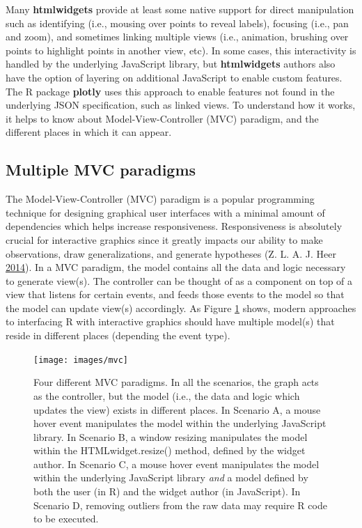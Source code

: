 \documentclass[12pt,]{isuthesis}
\begin{document}
Many \textbf{htmlwidgets} provide at least some native support for
direct manipulation such as identifying (i.e., mousing over points to
reveal labels), focusing (i.e., pan and zoom), and sometimes linking
multiple views (i.e., animation, brushing over points to highlight
points in another view, etc). In some cases, this interactivity is
handled by the underlying JavaScript library, but \textbf{htmlwidgets}
authors also have the option of layering on additional JavaScript to
enable custom features. The R package \textbf{plotly} uses this approach
to enable features not found in the underlying JSON specification, such
as linked views. To understand how it works, it helps to know about
Model-View-Controller (MVC) paradigm, and the different places in which
it can appear.

\subsection{Multiple MVC paradigms}\label{multiple-mvc-paradigms}

The Model-View-Controller (MVC) paradigm is a popular programming
technique for designing graphical user interfaces with a minimal amount
of dependencies which helps increase responsiveness. Responsiveness is
absolutely crucial for interactive graphics since it greatly impacts our
ability to make observations, draw generalizations, and generate
hypotheses (Z. L. A. J. Heer
\protect\hyperlink{ref-2014-latency}{2014}). In a MVC paradigm, the
model contains all the data and logic necessary to generate view(s). The
controller can be thought of as a component on top of a view that
listens for certain events, and feeds those events to the model so that
the model can update view(s) accordingly. As Figure \ref{fig:mvc} shows,
modern approaches to interfacing R with interactive graphics should have
multiple model(s) that reside in different places (depending the event
type).

\begin{figure}[htbp]
\centering
\texttt{[image: images/mvc]}
\caption{\label{fig:mvc}Four different MVC paradigms. In all the scenarios,
the graph acts as the controller, but the model (i.e., the data and
logic which updates the view) exists in different places. In Scenario A,
a mouse hover event manipulates the model within the underlying
JavaScript library. In Scenario B, a window resizing manipulates the
model within the HTMLwidget.resize() method, defined by the widget
author. In Scenario C, a mouse hover event manipulates the model within
the underlying JavaScript library \emph{and} a model defined by both the
user (in R) and the widget author (in JavaScript). In Scenario D,
removing outliers from the raw data may require R code to be executed.}
\end{figure}
\end{document}
